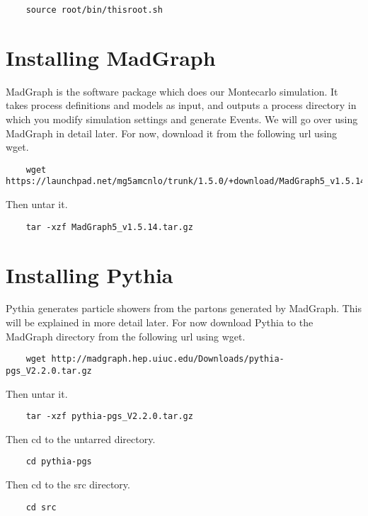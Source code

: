 \documentclass{article}
\begin{document}
\begin{verbatim}
	source root/bin/thisroot.sh
\end{verbatim}

\section{Installing MadGraph}

MadGraph is the software package which does our Montecarlo simulation. It takes process definitions and models as input, and outputs a process directory in which you modify simulation settings and generate Events. We will go over using MadGraph in detail later. For now, download it from the following url using wget.

\begin{verbatim}
	wget https://launchpad.net/mg5amcnlo/trunk/1.5.0/+download/MadGraph5_v1.5.14.tar.gz
\end{verbatim}

Then untar it.

\begin{verbatim}
	tar -xzf MadGraph5_v1.5.14.tar.gz
\end{verbatim}

\section {Installing Pythia}

Pythia generates particle showers from the partons generated by MadGraph. This will be explained in more detail later. For now download Pythia to the MadGraph directory from the following url using wget.

\begin{verbatim}
	wget http://madgraph.hep.uiuc.edu/Downloads/pythia-pgs_V2.2.0.tar.gz
\end{verbatim}

Then untar it.

\begin{verbatim}
	tar -xzf pythia-pgs_V2.2.0.tar.gz
\end{verbatim}

Then cd to the untarred directory.

\begin{verbatim}
	cd pythia-pgs
\end{verbatim}

Then cd to the src directory.

\begin{verbatim}
	cd src
\end{verbatim}
\end{document}
